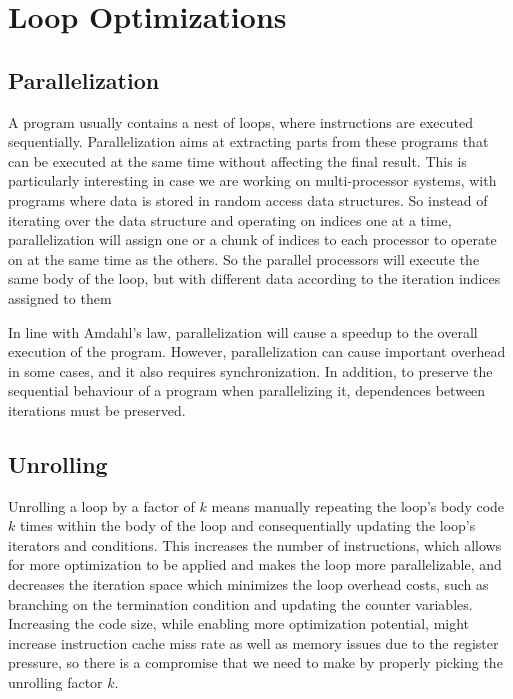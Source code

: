 \section{Loop Optimizations}\label{sec:aco:optims}
    

\subsection{Parallelization}
A program usually contains a nest of loops, where instructions are executed sequentially. Parallelization aims at extracting parts from these programs that can be executed at the same time without affecting the final result. This is particularly interesting in case we are working on multi-processor systems, with programs where data is stored in random access data structures. So instead of iterating over the data structure and operating on indices one at a time, parallelization will assign one or a chunk of indices to each processor to operate on at the same time as the others. So the parallel processors will execute the same body of the loop, but with different data according to the iteration indices assigned to them~\cite{parallel}

In line with Amdahl’s law, parallelization will cause a speedup to the overall execution of the program. However, parallelization can cause important overhead in some cases, and it also requires synchronization. In addition, to preserve the sequential behaviour of a program when parallelizing it, dependences between iterations must be preserved.


\subsection{Unrolling}
Unrolling a loop by a factor of $k$ means manually repeating the loop’s body code $k$ times within the body of the loop and consequentially updating the loop’s iterators and conditions. This increases the number of instructions, which allows for more optimization to be applied and makes the loop more parallelizable, and decreases the iteration space which  minimizes the loop overhead costs, such as branching on the termination condition and updating the counter variables. Increasing the code size, while enabling more optimization potential, might increase instruction cache miss rate as well as memory issues due to the register pressure, so there is a compromise that we need to make by properly picking the unrolling factor $k$.

